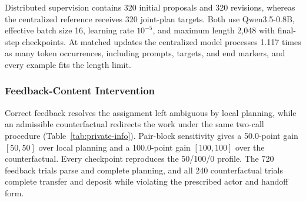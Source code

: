 \documentclass[sigconf,nonacm,balance=false]{aamas}
\newcommand{\tabstyle}{\small\setlength{\tabcolsep}{3pt}\renewcommand{\arraystretch}{1.10}}
\begin{document}
\begin{table}[!htbp]
  \centering
  \caption{Workcell feedback and centralized training budgets. Token occurrences include prompt, target, and end markers across the training epochs.}
  \label{tab:e1e2-training}
  \tabstyle
  
\end{table}

Distributed supervision contains 320 initial proposals and 320 revisions, whereas the centralized reference receives 320 joint-plan targets. Both use Qwen3.5-0.8B, effective batch size 16, learning rate $10^{-5}$, and maximum length 2,048 with final-step checkpoints. At matched updates the centralized model processes 1.117 times as many token occurrences, including prompts, targets, and end markers, and every example fits the length limit.

\subsubsection{Feedback-Content Intervention}

\begin{table}[!htbp]
  \centering
  \caption{Workcell task success and information components over 40 clusters forming 20 mode pairs. Intervals use the cluster bootstrap, and strict success requires all six role--checkpoint repetitions to succeed. The final column measures the stated message component.}
  \label{tab:private-info}
  \tabstyle
  
\end{table}

Correct feedback resolves the assignment left ambiguous by local planning, while an admissible counterfactual redirects the work under the same two-call procedure (Table~\ref{tab:private-info}). Pair-block sensitivity gives a 50.0-point gain $[50,50]$ over local planning and a 100.0-point gain $[100,100]$ over the counterfactual. Every checkpoint reproduces the 50/100/0 profile. The 720 feedback trials parse and complete planning, and all 240 counterfactual trials complete transfer and deposit while violating the prescribed actor and handoff form.

\begin{table}[!htbp]
  \centering
  \caption{Assignment fields after counterfactual feedback, separating the altered division of work from the unchanged requested product.}
  \label{tab:feedback-field-fidelity}
  \tabstyle
  
\end{table}
\end{document}
